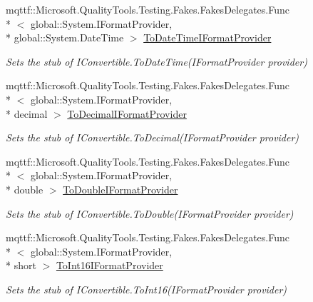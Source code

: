 \begin{DoxyCompactItemize}
mqttf\-::\-Microsoft.\-Quality\-Tools.\-Testing.\-Fakes.\-Fakes\-Delegates.\-Func\\*
$<$ global\-::\-System.\-I\-Format\-Provider, \\*
global\-::\-System.\-Date\-Time $>$ \hyperlink{class_system_1_1_fakes_1_1_stub_i_convertible_a34abca04fa1bcb73e1e14484fb264b03}{To\-Date\-Time\-I\-Format\-Provider}
\begin{DoxyCompactList}\small\item\em Sets the stub of I\-Convertible.\-To\-Date\-Time(\-I\-Format\-Provider provider)\end{DoxyCompactList}\item 
mqttf\-::\-Microsoft.\-Quality\-Tools.\-Testing.\-Fakes.\-Fakes\-Delegates.\-Func\\*
$<$ global\-::\-System.\-I\-Format\-Provider, \\*
decimal $>$ \hyperlink{class_system_1_1_fakes_1_1_stub_i_convertible_a8dbe733e6b0788fcb25459f45af5b021}{To\-Decimal\-I\-Format\-Provider}
\begin{DoxyCompactList}\small\item\em Sets the stub of I\-Convertible.\-To\-Decimal(\-I\-Format\-Provider provider)\end{DoxyCompactList}\item 
mqttf\-::\-Microsoft.\-Quality\-Tools.\-Testing.\-Fakes.\-Fakes\-Delegates.\-Func\\*
$<$ global\-::\-System.\-I\-Format\-Provider, \\*
double $>$ \hyperlink{class_system_1_1_fakes_1_1_stub_i_convertible_a3cb2d8eab3d62022832c0c15a4e43591}{To\-Double\-I\-Format\-Provider}
\begin{DoxyCompactList}\small\item\em Sets the stub of I\-Convertible.\-To\-Double(\-I\-Format\-Provider provider)\end{DoxyCompactList}\item 
mqttf\-::\-Microsoft.\-Quality\-Tools.\-Testing.\-Fakes.\-Fakes\-Delegates.\-Func\\*
$<$ global\-::\-System.\-I\-Format\-Provider, \\*
short $>$ \hyperlink{class_system_1_1_fakes_1_1_stub_i_convertible_adfe9961a04396d7557876a3de96fbbed}{To\-Int16\-I\-Format\-Provider}
\begin{DoxyCompactList}\small\item\em Sets the stub of I\-Convertible.\-To\-Int16(\-I\-Format\-Provider provider)\end{DoxyCompactList}\item 

\end{DoxyCompactItemize}
